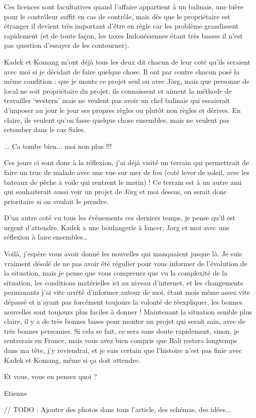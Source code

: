 Ces licences sont facultatives quand l’affaire appartient à un balinais, une bière pour le contrôleur suffit en cas de contrôle, mais dès que le propriétaire est étranger il devient très important d’être en règle car les problème grandissent rapidement (et de toute façon, les taxes Indonésiennes étant très basses il n’est pas question d’essayer de les contourner).

Kadek et Komang m’ont déjà tous les deux dit chacun de leur coté qu’ils seraient avec moi si je décidait de faire quelque chose. Il ont par contre chacun posé la même condition : que je monte ce projet seul ou avec Jörg, mais que personne de local ne soit propriétaire du projet, ils connaissent et aiment la méthode de travailler ‘western’ mais ne veulent pas avoir un chef balinais qui essaierait d’imposer au jour le jour ses propres règles ou plutôt non règles et dérives. En claire, ils veulent qu’on fasse quelque chose ensembles, mais ne veulent pas retomber dans le cas Sales.

... Ca tombe bien... moi non plus !!!

Ces jours ci sont donc à la réflexion, j’ai déjà visité un terrain qui permettrait de faire un truc de malade avec une vue sur mer de fou (coté lever de soleil, avec les bateaux de pêche à voile qui rentrent le matin) ! Ce terrain est à un autre ami qui souhaiterait aussi voir un projet de Jörg et moi dessus, on serait donc prioritaire si on voulait le prendre.

D’un autre coté vu tous les évènements ces derniers temps, je pense qu’il est urgent d’attendre, Kadek a une boulangerie à lancer, Jorg et moi avec une réflexion à faire ensembles…

Voilà, j’espère vous avoir donné les nouvelles qui manquaient jusque là. Je suis vraiment désolé de ne pas avoir été régulier pour vous informer de l’évolution de la situation, mais je pense que vous comprenez que vu la complexité de la situation, les conditions matérielles ici au niveau d’internet, et les changements permanants j’ai vite arrêté d’informer autour de moi, étant mois même assez vite dépassé et n’ayant pas forcément toujours la volonté de réexpliquer, les bonnes nouvelles sont toujours plus faciles à donner ! Maintenant la situation semble plus claire, il y a de très bonnes bases pour monter un projet qui serait sain, avec de très bonnes personnes. Si cela se fait, ce sera sans doute rapidement, sinon, je rentrerais en France, mais vous avez bien compris que Bali restera longtemps dans ma tête, j’y reviendrai, et je suis certain que l’histoire n’est pas finie avec Kadek et Komang, même si ça doit attendre.

Et vous, vous en pensez quoi ?

Etienne

// TODO : Ajouter des photos dans tous l'article, des schémas, des idées...


\vfill
